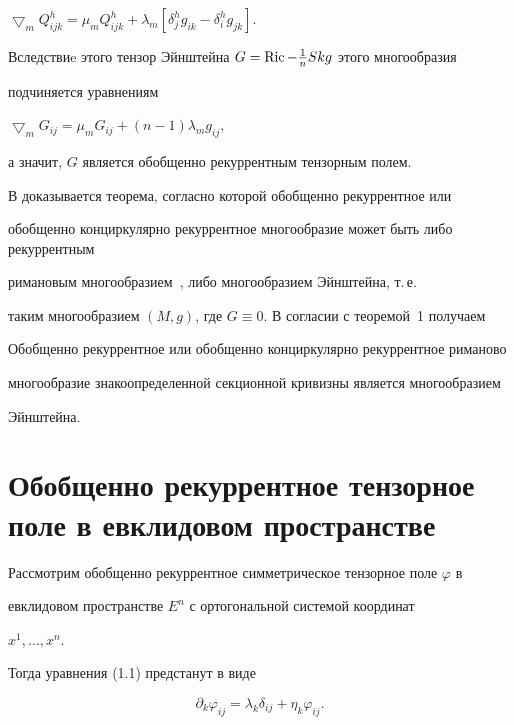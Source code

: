 $\bigtriangledown_m Q^h_{ijk}=


\mu_mQ^h_{ijk}+\lambda_m[\delta^h_j g_{ik}-\delta^h_i g_{jk}]$.





Вследствиe этого тензор Эйнштейна $G=\operatorname{Ric}-\frac{1}{n} Sk g$ этого многообразия


подчиняется уравнениям


$\bigtriangledown_m G_{ij}=\mu_mG_{ij}+(n-1)\lambda_m g_{ij}$,


а значит, $G$ является обобщенно рекуррентным тензорным полем.





В \cite{tr1} доказывается теорема, согласно которой обобщенно рекуррентное или


обобщенно конциркулярно рекуррентное многообразие может быть либо рекуррентным


римановым многообразием~\cite{tr6}, либо многообразием Эйнштейна, т.\,е.


таким многообразием $(M,g)$, где $G\equiv0$. В согласии с теоремой~1 получаем





\begin{cor}


Обобщенно рекуррентное или обобщенно конциркулярно рекуррентное риманово


многообразие знакоопределенной секционной кривизны является многообразием


Эйнштейна.


\end{cor}





\section{Обобщенно рекуррентное тензорное поле в евклидовом пространстве}





Рассмотрим обобщенно рекуррентное симметрическое тензорное поле $\varphi$ в


евклидовом пространстве $E^n$ с ортогональной системой координат


$x^1,\dotsc,x^n$.


Тогда уравнения (1.1) предстанут в виде


\begin{equation}


\partial_k\varphi_{ij}=\lambda_k\delta_{ij}+\eta_k\varphi_{ij}.


\end{equation}


